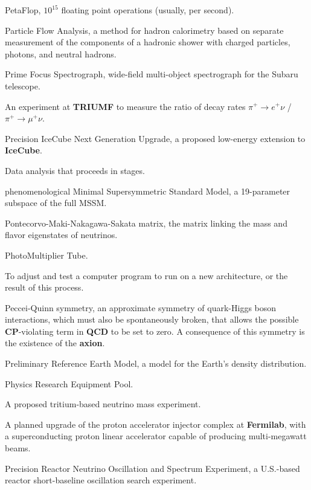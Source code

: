    PetaFlop, $10^{15}$ floating point operations
(usually, per second). 


 Particle Flow Analysis, a method for hadron
calorimetry based on separate measurement of the components of a
hadronic shower with charged particles, photons, and neutral hadrons.


  Prime Focus Spectrograph, wide-field multi-object spectrograph
for the Subaru telescope.

  An experiment at {\bf TRIUMF} to measure the ratio
of  decay rates  $\pi^+\to e^+\nu$ / $\pi^+ \to \mu^+ \nu$. 


  Precision IceCube Next Generation Upgrade,  a 
proposed low-energy extension to {\bf IceCube}.

  Data analysis that proceeds in stages.

  phenomenological Minimal Supersymmetric Standard Model, 
a 19-parameter subspace of the full MSSM.


 Pontecorvo-Maki-Nakagawa-Sakata matrix, the matrix
linking the mass and flavor eigenstates of neutrinos. 
 
 PhotoMultiplier Tube.

  To adjust and test a computer program to run on a
new architecture, or the result of this process.

  Peccei-Quinn symmetry, an approximate symmetry of
quark-Higgs boson interactions, which must also be spontaneously
broken, that allows the possible  {\bf CP}-violating term   in {\bf
  QCD}   to be set to zero.  A consequence of this symmetry is the
 existence of the {\bf axion}. 

 Preliminary Reference Earth Model, a model for the
Earth's density distribution.

 Physics Research Equipment Pool.


 A proposed tritium-based neutrino mass experiment.

 A planned upgrade of the proton accelerator
injector complex at {\bf Fermilab}, with a superconducting proton 
linear accelerator capable of producing multi-megawatt beams.

 Precision Reactor Neutrino Oscillation and Spectrum
Experiment, a U.S.-based reactor short-baseline oscillation search experiment.

